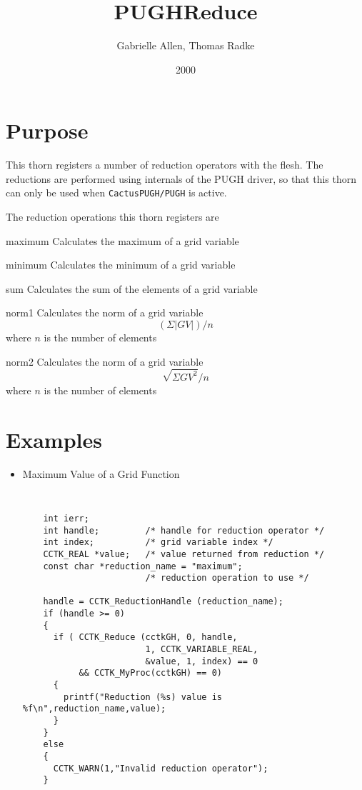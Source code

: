 \documentclass{article}
\newcommand{\entrylabel}[1]{\mbox{\textsf{#1}}\hfil}
\newenvironment{entry}
  {\begin{list}{}
    {\renewcommand{\makelabel}{\entrylabel}
      \setlength{\labelwidth}{90pt}
      \setlength{\leftmargin}{\labelwidth+\labelsep}
    }
  }
  {\end{list}}
\newlength{\Mylen}
\newcommand{\Lentrylabel}[1]{%
  \settowidth{\Mylen}{\textsf{#1}}%
  \ifthenelse{\lengthtest{\Mylen > \labelwidth}}%
    {\parbox[b]{\labelwidth} %
      {\makebox[0pt][l]{\textsf{#1}}\\}} %
    {\textsf{#1}} %

  \hfil\relax}
\newenvironment{Lentry}
  {\renewcommand{\entrylabel}{\Lentrylabel}
   \begin{entry}}
  {\end{entry}}
\begin{document}
\title{PUGHReduce}
\author{Gabrielle Allen, Thomas Radke}
\date{2000}
\maketitle


\section{Purpose}

This thorn registers a number of reduction operators with the flesh. The 
reductions are performed using internals of the PUGH driver, so that this
thorn can only be used when {\tt CactusPUGH/PUGH} is active.

The reduction operations this thorn registers are

\begin{Lentry}
\item[maximum]
	Calculates the maximum of a grid variable
\item[minimum]
	Calculates the minimum of a grid variable
\item[sum]
	Calculates the sum of the elements of a grid variable
\item[norm1]
	Calculates the norm of a grid variable
	$$
	\left(\Sigma | GV | \right)/n
	$$
	where $n$ is the number of elements
	
\item[norm2]
	Calculates the norm of a grid variable
	$$
	\sqrt{\Sigma GV^2}/n
	$$
	where $n$ is the number of elements
	
\end{Lentry}

\section{Examples}

\begin{itemize}

\item{} Maximum Value of a Grid Function

{\tt
\begin{verbatim}
    int ierr;
    int handle;         /* handle for reduction operator */
    int index; 	        /* grid variable index */
    CCTK_REAL *value;   /* value returned from reduction */
    const char *reduction_name = "maximum";
                        /* reduction operation to use */

    handle = CCTK_ReductionHandle (reduction_name);
    if (handle >= 0) 
    {
      if ( CCTK_Reduce (cctkGH, 0, handle, 
                        1, CCTK_VARIABLE_REAL,
                        &value, 1, index) == 0 
           && CCTK_MyProc(cctkGH) == 0)
      {
        printf("Reduction (%s) value is %f\n",reduction_name,value);
      }
    }
    else
    {
      CCTK_WARN(1,"Invalid reduction operator"); 
    }
\end{verbatim}
}

\end{itemize}





\end{document}
